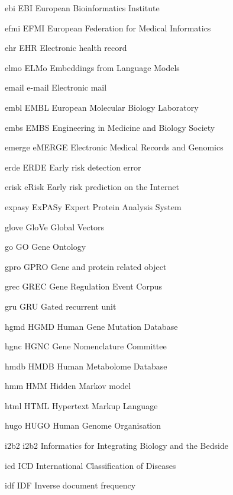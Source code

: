 \newabbreviation
{ebi}
{EBI}
{European Bioinformatics Institute}

\newabbreviation
{efmi}
{EFMI}
{European Federation for Medical Informatics}

\newabbreviation
{ehr}
{EHR}
{Electronic health record}

\newabbreviation
{elmo}
{ELMo}
{Embeddings from Language Models}

\newabbreviation
{email}
{e-mail}
{Electronic mail}

\newabbreviation
{embl}
{EMBL}
{European Molecular Biology Laboratory}

\newabbreviation
{embs}
{EMBS}
{Engineering in Medicine and Biology Society}

\newabbreviation
{emerge}
{eMERGE}
{Electronic Medical Records and Genomics}

\newabbreviation
{erde}
{ERDE}
{Early risk detection error}

\newabbreviation
{erisk}
{eRisk}
{Early risk prediction on the Internet}

\newabbreviation
{expasy}
{ExPASy}
{Expert Protein Analysis System}

\newabbreviation
{glove}
{GloVe}
{Global Vectors}

\newabbreviation
{go}
{GO}
{Gene Ontology}

\newabbreviation
{gpro}
{GPRO}
{Gene and protein related object}

\newabbreviation
{grec}
{GREC}
{Gene Regulation Event Corpus}

\newabbreviation
{gru}
{GRU}
{Gated recurrent unit}

\newabbreviation
{hgmd}
{HGMD}
{Human Gene Mutation Database}

\newabbreviation
{hgnc}
{HGNC}
{ Gene Nomenclature Committee}

\newabbreviation
{hmdb}
{HMDB}
{Human Metabolome Database}

\newabbreviation
{hmm}
{HMM}
{Hidden Markov model}

\newabbreviation
{html}
{HTML}
{Hypertext Markup Language}

\newabbreviation
{hugo}
{HUGO}
{Human Genome Organisation}

\newabbreviation
{i2b2}
{i2b2}
{Informatics for Integrating Biology and the Bedside}

\newabbreviation
{icd}
{ICD}
{International Classification of Diseases}

\newabbreviation
{idf}
{IDF}
{Inverse document frequency}

